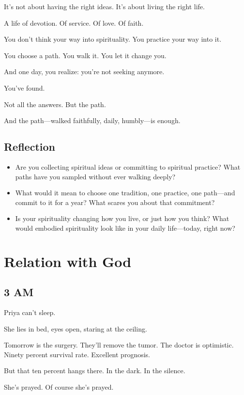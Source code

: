 \documentclass[11pt,twoside]{book}
\begin{document}
It's not about having the right ideas. It's about living the right life.

A life of devotion. Of service. Of love. Of faith.

You don't think your way into spirituality. You practice your way into it.

You choose a path. You walk it. You let it change you.

And one day, you realize: you're not seeking anymore.

You've found.

Not all the answers. But the path.

And the path—walked faithfully, daily, humbly—is enough.

\section*{Reflection}

\begin{itemize}
\item Are you collecting spiritual ideas or committing to spiritual practice? What paths have you sampled without ever walking deeply?
\item What would it mean to choose one tradition, one practice, one path—and commit to it for a year? What scares you about that commitment?
\item Is your spirituality changing how you live, or just how you think? What would embodied spirituality look like in your daily life—today, right now?
\end{itemize}

\chapter{Relation with God}

\section*{3 AM}

Priya can't sleep.

She lies in bed, eyes open, staring at the ceiling.

Tomorrow is the surgery. They'll remove the tumor. The doctor is optimistic. Ninety percent survival rate. Excellent prognosis.

But that ten percent hangs there. In the dark. In the silence.

She's prayed. Of course she's prayed.
\end{document}
